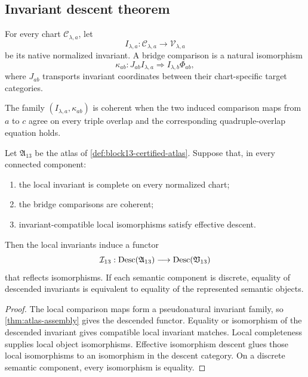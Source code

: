 \subsection{Invariant descent theorem}
\label{subsec:block13-invariant-descent}

For every chart \(\mathcal C_{\lambda,a}\), let
\[
 I_{\lambda,a}:\mathcal C_{\lambda,a}\longrightarrow\mathcal V_{\lambda,a}
\]
be its native normalized invariant.  A bridge comparison is a natural isomorphism
\[
 \kappa_{ab}:
 J_{ab}I_{\lambda,a}
 \Longrightarrow
 I_{\lambda,b}\Phi_{ab},
\]
where \(J_{ab}\) transports invariant coordinates between their chart-specific target categories.

\begin{definition}
The family \((I_{\lambda,a},\kappa_{ab})\) is coherent when the two induced comparison maps from \(a\) to \(c\) agree on every triple overlap and the corresponding quadruple-overlap equation holds.
\end{definition}

\begin{theorem}
\label{thm:block13-certified-invariant-descent}
Let \(\mathfrak A_{13}\) be the atlas of \cref{def:block13-certified-atlas}.  Suppose that, in every connected component:
\begin{enumerate}
\item the local invariant is complete on every normalized chart;
\item the bridge comparisons are coherent;
\item invariant-compatible local isomorphisms satisfy effective descent.
\end{enumerate}
Then the local invariants induce a functor
\[
 \mathcal I_{13}:
 \operatorname{Desc}(\mathfrak A_{13})
 \longrightarrow
 \operatorname{Desc}(\mathfrak V_{13})
\]
that reflects isomorphisms.  If each semantic component is discrete, equality of descended invariants is equivalent to equality of the represented semantic objects.
\end{theorem}

\begin{proof}
The local comparison maps form a pseudonatural invariant family, so \cref{thm:atlas-assembly} gives the descended functor.  Equality or isomorphism of the descended invariant gives compatible local invariant matches.  Local completeness supplies local object isomorphisms.  Effective isomorphism descent glues those local isomorphisms to an isomorphism in the descent category.  On a discrete semantic component, every isomorphism is equality.
\end{proof}


